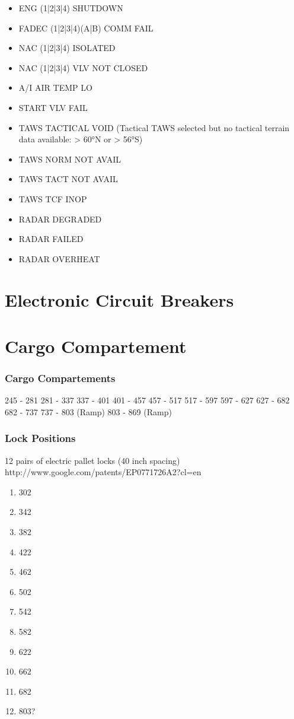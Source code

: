 \begin{itemize}
\item ENG (1|2|3|4) SHUTDOWN
\item FADEC (1|2|3|4)(A|B) COMM FAIL
\item NAC (1|2|3|4) ISOLATED
\item NAC (1|2|3|4) VLV NOT CLOSED
\item A/I AIR TEMP LO
\item START VLV FAIL
\item TAWS TACTICAL VOID (Tactical TAWS selected but no tactical terrain data available: > 60°N or > 56°S)
\item TAWS NORM NOT AVAIL
\item TAWS TACT NOT AVAIL
\item TAWS TCF INOP
\item RADAR DEGRADED
\item RADAR FAILED
\item RADAR OVERHEAT
\end{itemize}

\chapter{Electronic Circuit Breakers}
\label{sec:ecbs}

\chapter{Cargo Compartement}
\label{sec:cargo}

\subsection{Cargo Compartements}

\begin{itemize}
   245 - 281
   281 - 337
   337 - 401
   401 - 457
   457 - 517
   517 - 597
   597 - 627
   627 - 682
   682 - 737
   737 - 803 (Ramp)
   803 - 869 (Ramp)
\end{itemize}

\subsection{Lock Positions}

12 pairs of electric pallet locks (40 inch spacing) http://www.google.com/patents/EP0771726A2?cl=en

\begin{enumerate}
  \item 302
  \item 342
  \item 382
  \item 422
  \item 462
  \item 502
  \item 542
  \item 582
  \item 622
  \item 662
  \item 682
  \item 803?
\end{enumerate}

